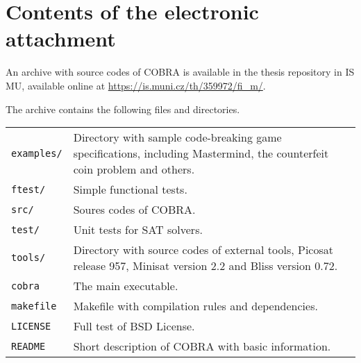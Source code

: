 \chapter*{Contents of the electronic attachment}

An archive with source codes of COBRA
is available in the thesis repository in IS MU,
available online at \url{https://is.muni.cz/th/359972/fi_m/}.

The archive contains the following files and directories.

\bigskip
\begin{tabularx}{\textwidth}{lX}
 \texttt{examples/}\hfill & Directory with sample code-breaking game specifications,
        including Mastermind, the counterfeit coin problem and others. \\
\texttt{ftest/} & Simple functional tests. \\
\texttt{src/} & Soures codes of COBRA. \\
\texttt{test/} & Unit tests for SAT solvers. \\
\texttt{tools/} & Directory with source codes of external tools, Picosat release 957, Minisat version 2.2 and Bliss version 0.72. \\
\texttt{cobra} & The main executable. \\
\texttt{makefile} & Makefile with compilation rules and dependencies. \\
\texttt{LICENSE} & Full test of BSD License. \\
\texttt{README} & Short description of COBRA with basic information. \\
\end{tabularx}
